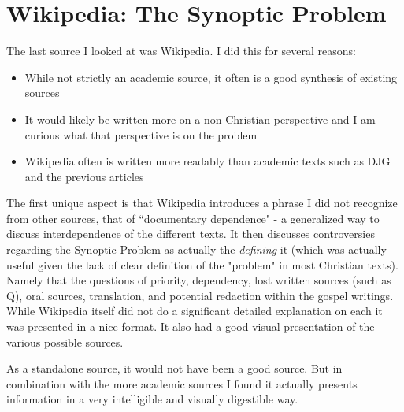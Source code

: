\documentclass[12pt]{turabian-researchpaper}
\begin{document}
\section{Wikipedia: The Synoptic Problem\autocite{wikipedia18}}
The last source I looked at was Wikipedia. I did this for several reasons:
\begin{itemize}
\item While not strictly an academic source, it often is a good synthesis of existing sources
\item It would likely be written more on a non-Christian perspective and I am curious what that perspective is on the problem
\item Wikipedia often is written more readably than academic texts such as DJG and the previous articles
\end{itemize}

The first unique aspect is that Wikipedia introduces a phrase I did not recognize from other sources, that of ``documentary dependence" - a generalized way to discuss interdependence of the different texts. It then discusses controversies regarding the Synoptic Problem as actually the \textit{defining} it (which was actually useful given the lack of clear definition of the "problem" in most Christian texts). Namely that the questions of priority, dependency, lost written sources (such as Q), oral sources, translation, and potential redaction within the gospel writings. While Wikipedia itself did not do a significant detailed explanation on each it was presented in a nice format.  It also had a good visual presentation of the various possible sources.

As a standalone source, it would not have been a good source. But in combination with the more academic sources I found it actually presents information in a very intelligible and visually digestible way.


\newpage


\printbibliography
\end{document}

